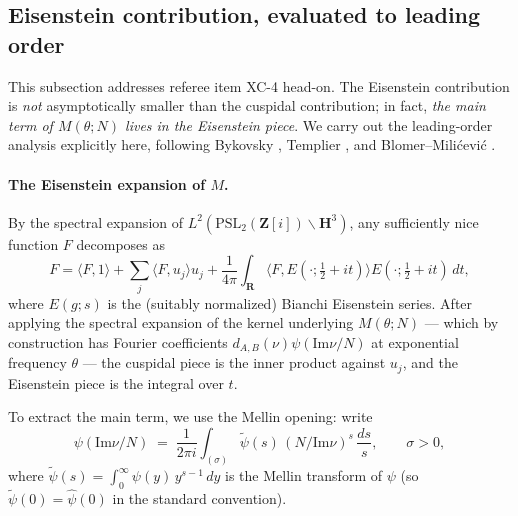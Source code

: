\documentclass[11pt]{article}
\theoremstyle{definition}
\newcommand{\Z}{\mathbf{Z}}
\newcommand{\R}{\mathbf{R}}
\newcommand{\HH}{\mathbf{H}}
\newcommand{\Zi}{\Z[i]}
\renewcommand{\Im}{\mathrm{Im}}
\begin{document}
\subsection{Eisenstein contribution, evaluated to leading order}\label{ssec:eisenstein}

This subsection addresses referee item XC-4 head-on. The Eisenstein contribution is \emph{not} asymptotically smaller than the cuspidal contribution; in fact, \emph{the main term of $M(\theta;N)$ lives in the Eisenstein piece}. We carry out the leading-order analysis explicitly here, following Bykovsky \cite{bykovsky}, Templier \cite{templier}, and Blomer--Mili\'cevi\'c \cite{BMilicevic}.

\paragraph{The Eisenstein expansion of $M$.}
By the spectral expansion of $L^2(\mathrm{PSL}_2(\Zi)\backslash\HH^3)$, any sufficiently nice function $F$ decomposes as
\[
   F = \langle F, 1\rangle + \sum_j \langle F, u_j\rangle u_j + \frac{1}{4\pi}\int_\R \langle F, E(\cdot;\tfrac{1}{2}+it)\rangle E(\cdot; \tfrac{1}{2}+it)\,dt,
\]
where $E(g;s)$ is the (suitably normalized) Bianchi Eisenstein series. After applying the spectral expansion of the kernel underlying $M(\theta;N)$ — which by construction has Fourier coefficients $d_{A,B}(\nu)\psi(\Im\nu/N)$ at exponential frequency $\theta$ — the cuspidal piece is the inner product against $u_j$, and the Eisenstein piece is the integral over $t$.

To extract the main term, we use the Mellin opening: write
\[
   \psi(\Im\nu/N) \;=\; \frac{1}{2\pi i}\int_{(\sigma)} \widetilde\psi(s)\,(N/\Im\nu)^s\,\frac{ds}{s}, \qquad \sigma > 0,
\]
where $\widetilde\psi(s) = \int_0^\infty \psi(y)\,y^{s-1}\,dy$ is the Mellin transform of $\psi$ (so $\widetilde\psi(0)=\widehat\psi(0)$ in the standard convention).
\end{document}
